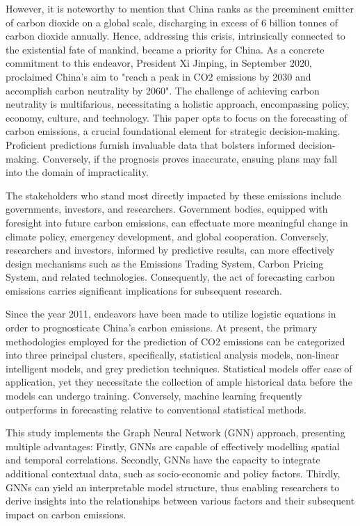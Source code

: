 \documentclass[sigconf, authordraft]{acmart}
\begin{document}
	However, it is noteworthy to mention that China ranks as the preeminent
	emitter of carbon dioxide on a global scale, discharging in excess of 6 billion
	tonnes of carbon dioxide annually. Hence, addressing this crisis,
	intrinsically connected to the existential fate of mankind, became a priority for
	China. As a concrete commitment to this endeavor, President Xi Jinping, in
	September 2020, proclaimed China's aim to "reach a peak in CO2 emissions by
	2030 and accomplish carbon neutrality by 2060". The challenge of achieving
	carbon neutrality is multifarious, necessitating a holistic approach,
	encompassing policy, economy, culture, and technology. This paper opts to
	focus on the forecasting of carbon emissions, a crucial foundational element for
	strategic decision-making. Proficient predictions furnish invaluable data that
	bolsters informed decision-making. Conversely, if the prognosis proves
	inaccurate, ensuing plans may fall into the domain of impracticality.

	The stakeholders who stand most directly impacted by these emissions include governments,
	investors, and researchers. Government bodies, equipped with foresight into future
	carbon emissions, can effectuate more meaningful change in climate policy, emergency
	development, and global cooperation. Conversely, researchers and investors, informed
	by predictive results, can more effectively design mechanisms such as the
	Emissions Trading System, Carbon Pricing System, and related technologies. Consequently,
	the act of forecasting carbon emissions carries significant implications for
	subsequent research.

	Since the year 2011, endeavors have been made to utilize logistic equations in
	order to prognosticate China's carbon emissions. At present, the primary methodologies
	employed for the prediction of CO2 emissions can be categorized into three principal
	clusters, specifically, statistical analysis models, non-linear intelligent
	models, and grey prediction techniques. Statistical models offer ease of
	application, yet they necessitate the collection of ample historical data before
	the models can undergo training. Conversely, machine learning frequently outperforms
	in forecasting relative to conventional statistical methods.

	This study implements the Graph Neural Network (GNN) approach, presenting
	multiple advantages: Firstly, GNNs are capable of effectively modelling
	spatial and temporal correlations. Secondly, GNNs have the capacity to
	integrate additional contextual data, such as socio-economic and policy factors.
	Thirdly, GNNs can yield an interpretable model structure, thus enabling
	researchers to derive insights into the relationships between various factors
	and their subsequent impact on carbon emissions.
\end{document}
